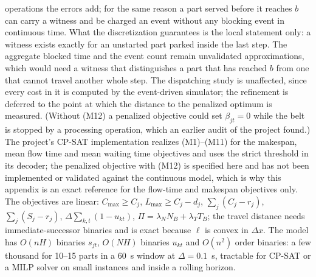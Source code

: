 \documentclass[11pt,a4paper]{article}
\theoremstyle{plain}
\theoremstyle{definition}
\theoremstyle{remark}
\begin{document}
operations the errors add; for the same reason a part served before it reaches $b$ can
carry a witness and be charged an event without any blocking event in continuous time.
What the discretization guarantees is the local statement only: a witness exists exactly
for an unstarted part parked inside the last step. The aggregate blocked time and the
event count remain unvalidated approximations, which would need a witness that
distinguishes a part that has reached $b$ from one that cannot travel another whole
step. The dispatching study is unaffected, since every cost in it is computed by the
event-driven simulator; the refinement is deferred to the point at which the distance
to the penalized optimum is measured. (Without (M12) a penalized objective could
set $\beta_{jt}=0$ while the belt is stopped by a processing operation, which an earlier
audit of the project found.) The project's CP-SAT implementation realizes (M1)--(M11)
for the makespan, mean flow time and mean waiting time objectives and uses the strict threshold in its decoder;
the penalized objective with (M12) is specified here and has not been implemented or
validated against the continuous model, which is why this appendix is an exact
reference for the flow-time and makespan objectives only. The objectives are
linear: $C_{\max}\ge C_j$, $L_{\max}\ge C_j-d_j$, $\sum_j(C_j-r_j)$, $\sum_j(S_j-r_j)$,
$\Delta\sum_{k,t}(1-u_{kt})$, $\Pi=\lambda_NN_B+\lambda_TT_B$; the travel distance needs
immediate-successor binaries and is exact because $\ell$ is convex in $\Delta x$. The
model has $O(nH)$ binaries $s_{jt}$, $O(NH)$ binaries $u_{kt}$ and $O(n^2)$ order binaries:
a few thousand for 10--15 parts in a 60~s window at $\Delta=0.1$~s, tractable for CP-SAT or
a MILP solver on small instances and inside a rolling horizon.
\end{document}
